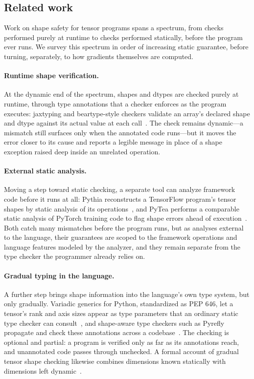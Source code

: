 \documentclass[sigconf,nonacm]{acmart}
\begin{document}
\subsection{Related work}
\label{sec:bg:related}

Work on shape safety for tensor programs spans a spectrum, from checks
performed purely at runtime to checks performed statically, before the program
ever runs. We survey this spectrum in order of increasing static guarantee,
before turning, separately, to how gradients themselves are computed.

\paragraph{Runtime shape verification.}
At the dynamic end of the spectrum, shapes and dtypes are checked purely at
runtime, through type annotations that a checker enforces as the program
executes: jaxtyping and beartype-style checkers validate an array's declared
shape and dtype against its actual value at each call~\cite{kidger2022jaxtyping}.
The check remains dynamic---a mismatch still surfaces only when the annotated
code runs---but it moves the error closer to its cause and reports a legible
message in place of a shape exception raised deep inside an unrelated
operation.

\paragraph{External static analysis.}
Moving a step toward static checking, a separate tool can analyze framework
code before it runs at all: Pythia reconstructs a TensorFlow program's tensor
shapes by static analysis of its operations~\cite{lagouvardos2020pythia}, and
PyTea performs a comparable static analysis of PyTorch training code to flag
shape errors ahead of execution~\cite{jhoo2021pytea}. Both catch many
mismatches before the program runs, but as analyses external to the language,
their guarantees are scoped to the framework operations and language features
modeled by the analyzer, and they remain separate from the type checker the
programmer already relies on.

\paragraph{Gradual typing in the language.}
A further step brings shape information into the language's own type system,
but only gradually. Variadic generics for Python, standardized as PEP 646, let
a tensor's rank and axis sizes appear as type parameters that an ordinary
static type checker can consult~\cite{pep646}, and shape-aware type checkers
such as Pyrefly propagate and check these annotations across a
codebase~\cite{pyrefly}. The checking is optional and partial: a program is
verified only as far as its annotations reach, and unannotated code passes
through unchecked. A formal account of gradual tensor shape checking likewise
combines dimensions known statically with dimensions left
dynamic~\cite{eremondi2023graten}.
\end{document}
